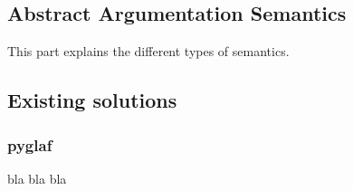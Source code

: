 \documentclass[../Dissertation.tex]{subfiles}
\begin{document}
	\subsection{Abstract Argumentation Semantics}
	This part explains the different types of semantics.
	
	\subsection{Existing solutions}
	\subsubsection{pyglaf}
	bla bla bla
\end{document}
